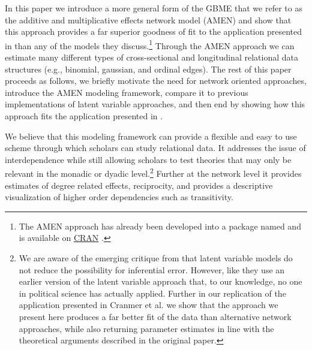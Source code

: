 In this paper we introduce a more general form of the GBME that we refer to as the additive and multiplicative effects network model (AMEN) and show that this approach provides a far superior goodness of fit to the application presented in \citet{cranmer:etal:2016} than any of the models they discuss.\footnote{The AMEN approach has already been developed into a package named  and is available on \href{https://cran.r-project.org/web/packages/amen/index.html}{CRAN} \citep{hoff:etal:2015}.} Through the AMEN approach we can estimate many different types of cross-sectional and longitudinal relational data structures (e.g., binomial, gaussian, and ordinal edges). The rest of this paper proceeds as follows, we briefly motivate the need for network oriented approaches, introduce the AMEN modeling framework, compare it to previous implementations of latent variable approaches, and then end by showing how this approach fits the application presented in \citet{cranmer:etal:2016}. 

We believe that this modeling framework can provide a flexible and easy to use scheme through which scholars can study relational data. It addresses the issue of interdependence while still allowing scholars to test theories that may only be relevant in the monadic or dyadic level.\footnote{We are aware of the emerging critique from \citet{jones:etal:2016} that latent variable models do not reduce the possibility for inferential error. However, like \citet{cranmer:etal:2016} they use an earlier version of the latent variable approach that, to our knowledge, no one in political science has actually applied. Further in our replication of the application presented in Cranmer et al. we show that the approach we present here produces a far better fit of the data than alternative network approaches, while also returning parameter estimates in line with the theoretical arguments described in the original paper.} Further at the network level it provides estimates of degree related effects, reciprocity, and provides a descriptive visualization of higher order dependencies such as transitivity. 



